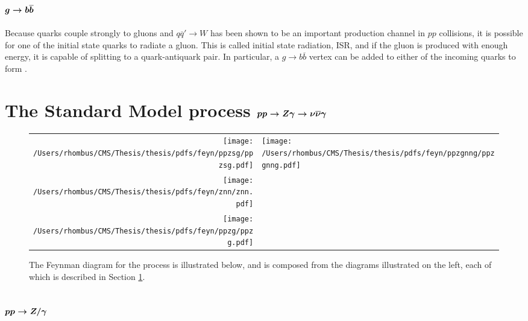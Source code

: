  \subsection[\gbb]
 {$\boldsymbol{g\rightarrow b\overline{b}}$}
  Because quarks couple strongly to gluons
   and $q\overline{q}'\rightarrow W$ has been shown to be
   an important production channel in $pp$ collisions,
   it is possible for one of the
   initial state quarks to radiate a gluon.
  This is called initial state radiation, ISR,
   and if the gluon is produced with enough energy,
   it is capable of splitting to a quark-antiquark pair.
  In particular, a $g\rightarrow b\overline{b}$ vertex
   can be added to either of the incoming quarks to 
   form \ppwbblnbb.
  
  
%
%

\section[The Standard Model process \ppzgnng]
        {The Standard Model process $\boldsymbol{pp\rightarrow Z\gamma\rightarrow\nu\overline{\nu}\gamma}$} \label{sec:znngproduction}

\begin{figure}[!h]
 \center
 \caption[Feynman diagrams for \ppzgnng]{
  The Feynman diagram for the process
   \ppzgnng is illustrated below,
   and is composed from the diagrams 
   illustrated on the left, each of which is
   described in Section \ref{sec:znngproduction}.
 } 
\begin{tabular}{rl}
 \texttt{[image: /Users/rhombus/CMS/Thesis/thesis/pdfs/feyn/ppzsg/ppzsg.pdf]} & 
 \multirow{3}{*}{\texttt{[image: /Users/rhombus/CMS/Thesis/thesis/pdfs/feyn/ppzgnng/ppzgnng.pdf]}} \\
 \texttt{[image: /Users/rhombus/CMS/Thesis/thesis/pdfs/feyn/znn/znn.pdf]} & {} \\
 \texttt{[image: /Users/rhombus/CMS/Thesis/thesis/pdfs/feyn/ppzg/ppzg.pdf]} & {} 
\end{tabular} 
    \label{fig:ppwbblnbbfeyn}
\end{figure}

 \subsection[\ppzsg]
 {$\boldsymbol{pp\rightarrow Z/\gamma}$}

